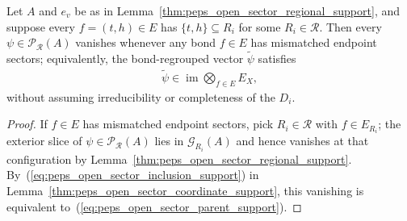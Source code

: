 \begin{lemma}%
    \label{thm:peps_open_sector_parent_support}
    \leanok
    Let $A$ and $e_v$ be as in Lemma~\ref{thm:peps_open_sector_regional_support},
    and suppose every $f=(t,h)\in E$ has $\{t,h\}\subseteq R_i$ for some
    $R_i\in\mathcal R$. Then every $\psi\in\mathcal P_{\mathcal R}(A)$ vanishes
    whenever any bond $f\in E$ has mismatched endpoint sectors; equivalently,
    the bond-regrouped vector $\widetilde\psi$ satisfies
    \begin{align}
        \widetilde\psi\in\operatorname{im}
        \bigotimes_{f\in E}E_X,
        \label{eq:peps_open_sector_parent_support}
    \end{align}
    without assuming irreducibility or completeness of the $D_i$.
\end{lemma}
\begin{proof}\leanok
    If $f\in E$ has mismatched endpoint sectors, pick $R_i\in\mathcal R$ with
    $f\in E_{R_i}$; the exterior slice of $\psi\in\mathcal P_{\mathcal R}(A)$
    lies in $\mathcal G_{R_i}(A)$ and hence vanishes at that configuration by
    Lemma~\ref{thm:peps_open_sector_regional_support}. By~(\ref{eq:peps_open_sector_inclusion_support})
    in Lemma~\ref{thm:peps_open_sector_coordinate_support}, this vanishing is
    equivalent to~(\ref{eq:peps_open_sector_parent_support}).
\end{proof}
